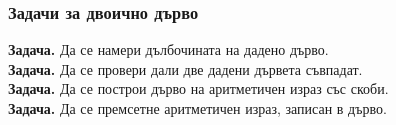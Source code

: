 \documentclass[alsotrans]{beamerswitch}
\begin{document}
\begin{frame}
  \frametitle{Задачи за двоично дърво}
  \textbf{Задача.} Да се намери дълбочината на дадено дърво.\\[4ex]\pause
  \textbf{Задача.} Да се провери дали две дадени дървета съвпадат.\\[4ex]\pause
  \textbf{Задача.} Да се построи дърво на аритметичен израз със скоби.\\[4ex]\pause
  \textbf{Задача.} Да се премсетне аритметичен израз, записан в дърво.\\[4ex]
\end{frame}
\end{document}
